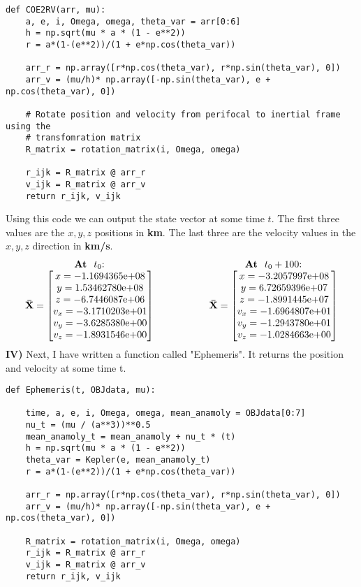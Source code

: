 \documentclass[a4paper, 12pt]{article}  %
\begin{document}
\begin{lstlisting}   
def COE2RV(arr, mu):
    a, e, i, Omega, omega, theta_var = arr[0:6]
    h = np.sqrt(mu * a * (1 - e**2))
    r = a*(1-(e**2))/(1 + e*np.cos(theta_var))

    arr_r = np.array([r*np.cos(theta_var), r*np.sin(theta_var), 0])
    arr_v = (mu/h)* np.array([-np.sin(theta_var), e + np.cos(theta_var), 0])

    # Rotate position and velocity from perifocal to inertial frame using the 
    # transfomration matrix
    R_matrix = rotation_matrix(i, Omega, omega)

    r_ijk = R_matrix @ arr_r
    v_ijk = R_matrix @ arr_v
    return r_ijk, v_ijk
\end{lstlisting}
Using this code we can output the state vector at some time $t$. The first three values 
are the $x,y,z$ positions in \textbf{km}. The last three are the velocity values in the $x,y,z$ direction 
in \textbf{km/s}.
\[
\begin{tabular}{c@{\hspace{2cm}}c}
\textbf{At } $t_0$: &
\textbf{At } $t_0 + 100$: \\
$\mathbf{\bar{X}} =
\begin{bmatrix}
x = -1.1694365\mathrm{e}{+08} \\
y =  1.53462780\mathrm{e}{+08} \\
z = -6.7446087\mathrm{e}{+06} \\
v_x = -3.1710203\mathrm{e}{+01} \\
v_y = -3.6285380\mathrm{e}{+00} \\
v_z = -1.8931546\mathrm{e}{+00}
\end{bmatrix}$ &
$\mathbf{\bar{X}} =
\begin{bmatrix}
x = -3.2057997\mathrm{e}{+08} \\
y =  6.72659396\mathrm{e}{+07} \\
z = -1.8991445\mathrm{e}{+07} \\
v_x = -1.6964807\mathrm{e}{+01} \\
v_y = -1.2943780\mathrm{e}{+01} \\
v_z = -1.0284663\mathrm{e}{+00}
\end{bmatrix}$
\end{tabular}
\]
\textbf{IV)} Next, I have written a function called "Ephemeris". It returns the position and velocity at some time t.
\begin{lstlisting}
def Ephemeris(t, OBJdata, mu):

    time, a, e, i, Omega, omega, mean_anamoly = OBJdata[0:7]
    nu_t = (mu / (a**3))**0.5
    mean_anamoly_t = mean_anamoly + nu_t * (t)
    h = np.sqrt(mu * a * (1 - e**2))
    theta_var = Kepler(e, mean_anamoly_t)
    r = a*(1-(e**2))/(1 + e*np.cos(theta_var))
    
    arr_r = np.array([r*np.cos(theta_var), r*np.sin(theta_var), 0])
    arr_v = (mu/h)* np.array([-np.sin(theta_var), e + np.cos(theta_var), 0])
    
    R_matrix = rotation_matrix(i, Omega, omega)
    r_ijk = R_matrix @ arr_r
    v_ijk = R_matrix @ arr_v
    return r_ijk, v_ijk
\end{lstlisting}
\end{document}
